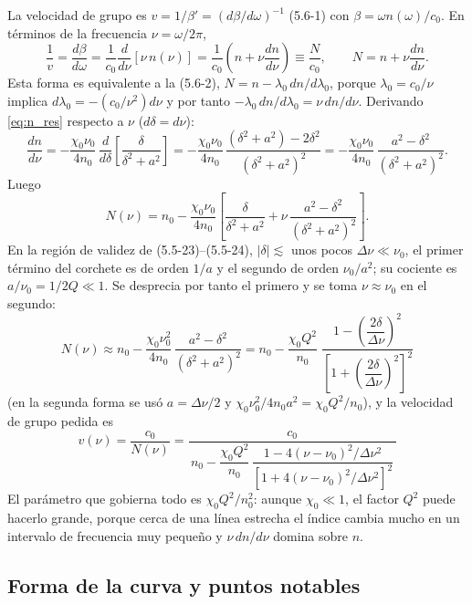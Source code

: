 \documentclass{article}
\begin{document}
La velocidad de grupo es $v=1/\beta'=\left(d\beta/d\omega\right)^{-1}$ (5.6-1) con
$\beta=\omega n(\omega)/c_0$. En términos de la frecuencia $\nu=\omega/2\pi$,
\[
\frac{1}{v}=\frac{d\beta}{d\omega}=\frac{1}{c_0}\frac{d}{d\nu}\left[\nu\,n(\nu)\right]
=\frac{1}{c_0}\left(n+\nu\frac{dn}{d\nu}\right)\equiv\frac{N}{c_0},
\qquad N=n+\nu\frac{dn}{d\nu}.
\]
Esta forma es equivalente a la (5.6-2), $N=n-\lambda_0\,dn/d\lambda_0$, porque
$\lambda_0=c_0/\nu$ implica $d\lambda_0=-(c_0/\nu^2)d\nu$ y por tanto
$-\lambda_0\,dn/d\lambda_0=\nu\,dn/d\nu$. Derivando \eqref{eq:n_res} respecto a $\nu$
($d\delta=d\nu$):
\[
\frac{dn}{d\nu}=-\frac{\chi_0\nu_0}{4n_0}\,\frac{d}{d\delta}\!\left[\frac{\delta}{\delta^2+a^2}\right]
=-\frac{\chi_0\nu_0}{4n_0}\,\frac{(\delta^2+a^2)-2\delta^2}{(\delta^2+a^2)^2}
=-\frac{\chi_0\nu_0}{4n_0}\,\frac{a^2-\delta^2}{(\delta^2+a^2)^2}.
\]
Luego
\begin{equation}
N(\nu)=n_0-\frac{\chi_0\nu_0}{4n_0}\left[\frac{\delta}{\delta^2+a^2}
+\nu\,\frac{a^2-\delta^2}{(\delta^2+a^2)^2}\right].
\label{eq:N_exacta}
\end{equation}
En la región de validez de (5.5-23)--(5.5-24), $|\delta|\lesssim$ unos pocos $\Delta\nu\ll\nu_0$,
el primer término del corchete es de orden $1/a$ y el segundo de orden $\nu_0/a^2$; su cociente
es $a/\nu_0=1/2Q\ll1$. Se desprecia por tanto el primero y se toma $\nu\approx\nu_0$ en el
segundo:
\begin{equation}
\boxed{\;N(\nu)\approx n_0-\frac{\chi_0\nu_0^2}{4n_0}\,
\frac{a^2-\delta^2}{(\delta^2+a^2)^2}
= n_0-\frac{\chi_0Q^2}{n_0}\;
\frac{1-\left(\dfrac{2\delta}{\Delta\nu}\right)^2}{\left[1+\left(\dfrac{2\delta}{\Delta\nu}\right)^2\right]^2}\;}
\label{eq:N_res}
\end{equation}
(en la segunda forma se usó $a=\Delta\nu/2$ y $\chi_0\nu_0^2/4n_0a^2=\chi_0Q^2/n_0$), y la
velocidad de grupo pedida es
\begin{equation}
\boxed{\;v(\nu)=\frac{c_0}{N(\nu)}
=\frac{c_0}{\,n_0-\dfrac{\chi_0Q^2}{n_0}\,
\dfrac{1-4(\nu-\nu_0)^2/\Delta\nu^2}{\left[1+4(\nu-\nu_0)^2/\Delta\nu^2\right]^2}\,}\;}
\label{eq:v_res}
\end{equation}
El parámetro que gobierna todo es $\chi_0Q^2/n_0^2$: aunque $\chi_0\ll1$, el factor $Q^2$ puede
hacerlo grande, porque cerca de una línea estrecha el índice cambia mucho en un intervalo de
frecuencia muy pequeño y $\nu\,dn/d\nu$ domina sobre $n$.

\subsection*{Forma de la curva y puntos notables}
\end{document}

